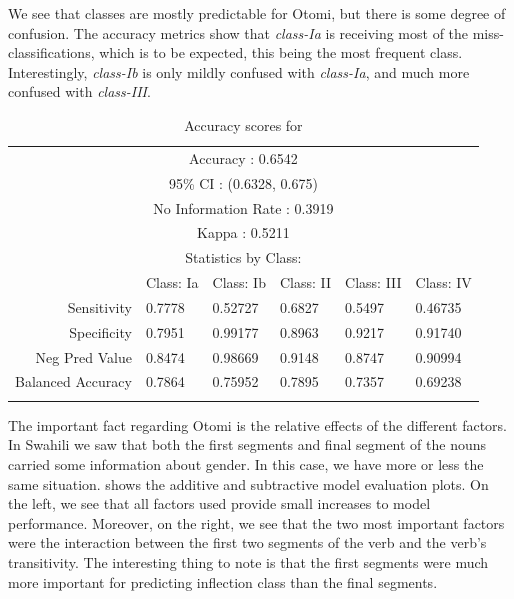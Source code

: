 We see that classes are mostly predictable for Otomi, but there is some degree of confusion. The accuracy metrics show that \textit{class-Ia} is receiving most of the miss-classifications, which is to be expected, this being the most frequent class. Interestingly, \textit{class-Ib} is only mildly confused with \textit{class-Ia}, and much more confused with \textit{class-III}.

\begin{table}
  \centering
  \begin{tabular}{rlllll}
    \lsptoprule
    \multicolumn{6}{c}{Overall Statistics}                                         \\
    \midrule
    \multicolumn{6}{c}{Accuracy : 0.6542}                                          \\
    \multicolumn{6}{c}{95\% CI : (0.6328, 0.675)}                                  \\
    \multicolumn{6}{c}{No Information Rate : 0.3919}                               \\
    \multicolumn{6}{c}{Kappa : 0.5211}                                             \\
    \midrule
    \multicolumn{6}{c}{Statistics by Class:}                                       \\
    \midrule
                      & Class: Ia & Class: Ib & Class: II & Class: III & Class: IV \\
    Sensitivity       & 0.7778    & 0.52727   & 0.6827    & 0.5497     & 0.46735   \\
    Specificity       & 0.7951    & 0.99177   & 0.8963    & 0.9217     & 0.91740   \\
    Neg Pred Value    & 0.8474    & 0.98669   & 0.9148    & 0.8747     & 0.90994   \\
    Balanced Accuracy & 0.7864    & 0.75952   & 0.7895    & 0.7357     & 0.69238   \\
    \lspbottomrule
  \end{tabular}
  \caption{Accuracy scores for }\label{tab:class-otomi-stats}
\end{table}


The important fact regarding Otomi is the relative effects of the different factors. In Swahili we saw that both the first segments and final segment of the nouns carried some information about gender. In this case, we have more or less the same situation.  shows the additive and subtractive model evaluation plots. On the left, we see that all factors used provide small increases to model performance. Moreover, on the right, we see that the two most important factors were the interaction between the first two segments of the verb and the verb's transitivity. The interesting thing to note is that the first segments were much more important for predicting inflection class than the final segments.

